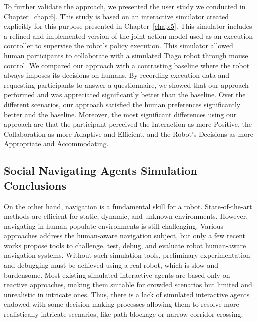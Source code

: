 To further validate the approach, we presented the user study we conducted in Chapter~\ref{chap:6}. This study is based on an interactive simulator created explicitly for this purpose presented in Chapter~\ref{chap:5}. This simulator includes a refined and implemented version of the joint action model used as an execution controller to supervise the robot's policy execution. This simulator allowed human participants to collaborate with a simulated Tiago robot through mouse control. We compared our approach with a contrasting baseline where the robot always imposes its decisions on humans. By recording execution data and requesting participants to answer a questionnaire, we showed that our approach performed and was appreciated significantly better than the baseline. Over the different scenarios, our approach satisfied the human preferences significantly better and the baseline. 
Moreover, the most significant differences using our approach are that the participant perceived the Interaction as more Positive, the Collaboration as more Adaptive and Efficient, and the Robot's Decisions as more Appropriate and Accommodating.    

\subsection*{Social Navigating Agents Simulation Conclusions}

On the other hand, navigation is a fundamental skill for a robot. State-of-the-art methods are efficient for static, dynamic, and unknown environments. However, navigating in human-populate environments is still challenging. Various approaches address the human-aware navigation subject, but only a few recent works propose tools to challenge, test, debug, and evaluate robot human-aware navigation systems. Without such simulation tools, preliminary experimentation and debugging must be achieved using a real robot, which is slow and burdensome. 
Most existing simulated interactive agents are based only on reactive approaches, making them suitable for crowded scenarios but limited and unrealistic in intricate ones. 
Thus, there is a lack of simulated interactive agents endowed with some decision-making processes allowing them to resolve more realistically intricate scenarios, like path blockage or narrow corridor crossing.

